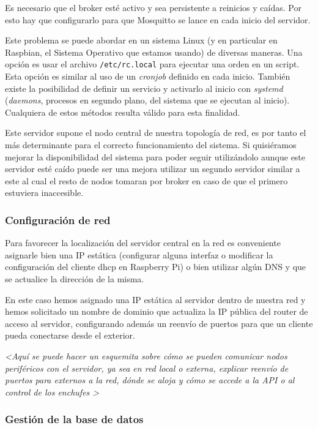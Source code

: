 \documentclass[a4paper,10pt]{article}
\begin{document}
Es necesario que el broker esté activo y sea persistente a reinicios y
caídas. Por esto hay que configurarlo para que Mosquitto se lance en
cada inicio del servidor.

Este problema se puede abordar en un sistema Linux (y en particular en
Raspbian, el Sistema Operativo que estamos usando) de diversas
maneras. Una opción es usar el archivo \texttt{/etc/rc.local} para
ejecutar una orden en un script. Esta opción es similar al uso de un
\textit{cronjob} definido en cada inicio. También existe la
posibilidad de definir un servicio y activarlo al inicio con
\textit{systemd} (\textit{daemons}, procesos en segundo plano, del
sistema que se ejecutan al inicio). Cualquiera de estos métodos
resulta válido para esta finalidad.

Este servidor supone el nodo central de nuestra topología de red, es
por tanto el más determinante para el correcto funcionamiento del
sistema. Si quisiéramos mejorar la disponibilidad del sistema para
poder seguir utilizándolo aunque este servidor esté caído puede ser
una mejora utilizar un segundo servidor similar a este al cual el
resto de nodos tomaran por broker en caso de que el primero estuviera
inaccesible.

\subsubsection{Configuración de red}

Para favorecer la localización del servidor central en la red es
conveniente asignarle bien una IP estática (configurar alguna interfaz
o modificar la configuración del cliente dhcp en Raspberry Pi) o bien
utilizar algún DNS y que se actualice la dirección de la misma.

En este caso hemos asignado una IP estática al servidor dentro de
nuestra red y hemos solicitado un nombre de dominio que actualiza la
IP pública del router de acceso al servidor, configurando además un
reenvío de puertos para que un cliente pueda conectarse desde el exterior.

\textit{\textless Aquí se puede hacer un esquemita sobre cómo se
  pueden comunicar nodos periféricos con el servidor, ya sea en red
  local o externa, explicar reenvío de puertos para externos a la red,
  dónde se aloja y cómo se accede a la API o al control de los
  enchufes \textgreater}

\subsubsection{Gestión de la base de datos}
\end{document}
